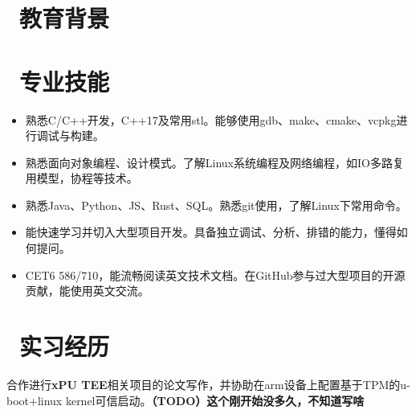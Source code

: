 \documentclass{resume}
\begin{document}


\basicInfo{
  \email{school\_mail@mail.sustech.edu.cn} \textperiodcentered\
  \phone{(+86) 这是电话} \textperiodcentered\
  \github[Fros1er]{https://github.com/Fros1er}}

\section{\faGraduationCap\  教育背景}
\begin{spacing}{1.125}
\end{spacing}

\section{\faBook\ 专业技能}
\begin{itemize}[parsep=0.5ex]
  \item 熟悉C/C++开发，C++17及常用stl。能够使用gdb、make、cmake、vcpkg进行调试与构建。
  \item 熟悉面向对象编程、设计模式。了解Linux系统编程及网络编程，如IO多路复用模型，协程等技术。
  \item 熟悉Java、Python、JS、Rust、SQL。熟悉git使用，了解Linux下常用命令。
  \item 能快速学习并切入大型项目开发。具备独立调试、分析、排错的能力，懂得如何提问。
  \item CET6 586/710，能流畅阅读英文技术文档。在GitHub参与过大型项目的开源贡献，能使用英文交流。
\end{itemize}

\section{\faUsers\ 实习经历}

\begin{spacing}{1.125}
  合作进行\textbf{xPU TEE}相关项目的论文写作，并协助在arm设备上配置基于TPM的u-boot+linux kernel可信启动。\textbf{（TODO）这个刚开始没多久，不知道写啥}
\end{spacing}
\end{document}
